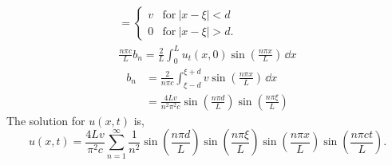 {\begin{Solution}
\begin{gather*}
    = \begin{cases}
      v &\mathrm{for}\ |x-\xi| < d \\
      0 &\mathrm{for}\ |x-\xi| > d.
    \end{cases} \\
    \frac{n \pi c}{L} b_n = \frac{2}{L} \int_0^L u_t(x, 0) 
    \sin\left( \frac{n \pi x}{L} \right) \,\dd x
  \end{gather*}
  \begin{align*}
    b_n &= \frac{2}{n \pi c} \int_{\xi-d}^{\xi+d} v
    \sin\left( \frac{n \pi x}{L} \right) \,\dd x \\
    &= \frac{4 L v}{n^2 \pi^2 c} \sin\left( \frac{n \pi d}{L} \right)
    \sin\left( \frac{n \pi \xi}{L} \right)
  \end{align*}
  The solution for $u(x, t)$ is,
  \[
  \boxed{
    u(x, t) = \frac{4 L v}{\pi^2 c} \sum_{n=1}^\infty \frac{1}{n^2} 
    \sin\left( \frac{n \pi d}{L} \right)
    \sin\left( \frac{n \pi \xi}{L} \right)
    \sin\left( \frac{n \pi x}{L} \right)
    \sin\left( \frac{n \pi c t}{L} \right).
    }
  \]


\end{Solution}}
